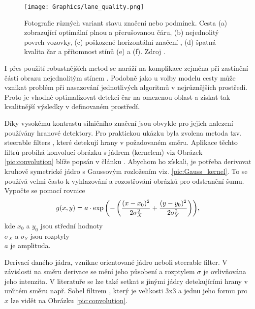 \documentclass[czech, bc, kky, he, iso690numb]{fasthesis}
\begin{document}
                	\begin{figure}[ht]
                		\centering
                		\texttt{[image: Graphics/lane\_quality.png]}
                		\caption{Fotografie různých variant stavu značení nebo podmínek. Cesta (a) zobrazující optimální plnou a přerušovanou čáru, (b) nejednolitý povrch vozovky, (c) poškozené horizontální značení , (d) špatná kvalita čar a přítomnost stínů (e) a (f). Zdroj \cite{VIOLET}.}
                		\label{pic:line_quality}
                	\end{figure}
                
                I přes použití robustnějších metod se naráží na komplikace zejména při zastínění části obrazu nejednolitým stínem \cite{VIOLET}. Podobně jako u volby modelu cesty může vznikat problém při nasazování jednotlivých algoritmů v nejrůznějších prostředí. Proto je vhodné optimalizovat detekci čar na omezenou oblast a získat tak kvalitnější výsledky v definovaném prostředí.
                
                Díky vysokému kontrastu silničního značení jsou obvykle pro jejich nalezení používány hranové detektory. Pro praktickou ukázku byla zvolena metoda tzv. steerable filters \cite{steerable_filters}, které detekují hrany v požadovaném směru. Aplikace těchto filtrů probíhá konvolucí obrázku s jádrem (kernelem) viz Obrázek \ref{pic:convolution} blíže popsán v článku \cite{2D_convolution}. Abychom ho získali, je potřeba derivovat kruhově symetrické jádro s Gaussovým rozložením viz. \ref{pic:Gauss_kernel}. To se používá velmi často k vyhlazování a rozostřování obrázků pro odstranění šumu. Vypočte se pomocí rovnice
	                \begin{equation}
	                    g(x,y)=a\cdot\exp{\left(-\left(\frac{(x-x_{0})^{2}}{2\sigma_{X}^{2}}+\frac{(y-y_{0})^{2}}{2\sigma_{Y}^{2}}\right)\right)},\\
	                \end{equation}
                kde \(x_{0}\) a \(y_{0}\) jsou střední hodnoty\\
                \(\sigma_{X}\) a \(\sigma_{Y}\) jsou rozptyly\\
                \(a\) je amplituda.
                
                Derivací daného jádra, vznikne orientované jádro neboli steerable filter. V závislosti na směru derivace se mění jeho působení a rozptylem \(\sigma\) je ovlivňována jeho intenzita. V literatuře se lze také setkat s jinými jádry detekujícími hrany v určitém směru např. Sobel filtrem \cite{sobel_filter_history}, který je velikosti 3x3 a jednu jeho formu pro \(x\) lze vidět na Obrázku \ref{pic:convolution}.
                
\end{document}
